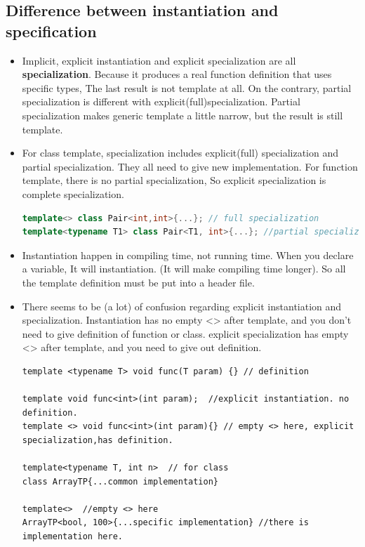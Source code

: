 \documentclass[a4paper,11pt,twoside]{book}
\begin{document}
\subsection{Difference between instantiation and specification}
\begin{itemize}
    \item Implicit, explicit instantiation and explicit specialization are all \textbf{specialization}. Because it produces a real function definition that uses specific types, The last result is not template at all.  On the contrary, partial specialization is different with explicit(full)specialization. Partial specialization makes generic template a little narrow, but the result is still template. 
    
    \item For class template, specialization includes explicit(full) specialization and partial specialization. They all need to give new implementation. For function template, there is no partial specialization, So explicit specialization is complete specialization. 
\begin{lstlisting}[frame=single, language=c++]
template<> class Pair<int,int>{...}; // full specialization 
template<typename T1> class Pair<T1, int>{...}; //partial specialization 	
\end{lstlisting}    

	\item Instantiation happen in compiling time, not running time. When you declare a variable, It will instantiation. (It will make compiling time longer). So all the template definition must be put into a header file.
    
   	\item There seems to be (a lot) of confusion regarding explicit instantiation and specialization. Instantiation has no empty <> after template, and you don't need to give definition of function or class. explicit specialization has empty <> after template, and you need to give out definition.
\begin{lstlisting}
template <typename T> void func(T param) {} // definition

template void func<int>(int param);  //explicit instantiation. no definition.
template <> void func<int>(int param){} // empty <> here, explicit specialization,has definition.

template<typename T, int n>  // for class
class ArrayTP{...common implementation}

template<>  //empty <> here
ArrayTP<bool, 100>{...specific implementation} //there is implementation here.	
\end{lstlisting}    


\end{itemize}
\end{document}
